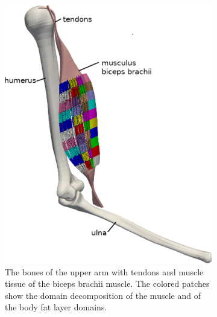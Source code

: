 \begin{figure}[H]
  \centering%
  \begin{subfigure}[t]{0.485\textwidth}%
    \centering%
    \includegraphics[width=\textwidth]{images/introduction/partitioning_names.png}%
  \caption{The bones of the upper arm with tendons and muscle tissue of the biceps brachii muscle. The colored patches show the domain decomposition of the muscle and of the body fat layer domains.}%
    \label{fig:partitioning_names}%
  \end{subfigure}
  \,
  \begin{subfigure}[t]{0.495\textwidth}%
    \centering%

\end{subfigure}
\end{figure}
